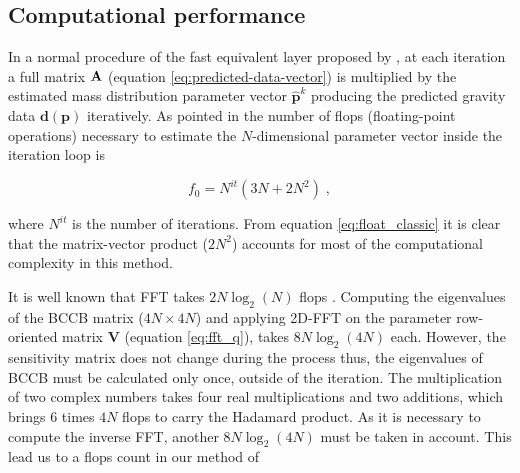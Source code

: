 \documentclass[manuscript,revised]{geophysics}
\begin{document}





\subsection{Computational performance}
In a normal procedure of the fast equivalent layer proposed by \citet{siqueira-etal2017}, at each iteration a full matrix $\tensor{A}$ (equation \ref{eq:predicted-data-vector}) is multiplied by the estimated mass distribution parameter vector $\hat{\mathbf{p}}^k$ producing the predicted gravity data $\mathbf{d(p)}$  iteratively. As pointed in \citet{siqueira-etal2017} the number of flops (floating-point operations) necessary to estimate the $N$-dimensional parameter vector inside the iteration loop is

\begin{equation}
f_0 = N^{it} (3N + 2N^2) \; ,
\label{eq:float_classic}
\end{equation}

\noindent where $N^{it}$ is the number of iterations. From equation \ref{eq:float_classic} it is clear that the matrix-vector product ($2N^2$) accounts for most of the computational complexity in this method.

It is well known that FFT takes $2 N \log_2(N)$ flops \citep{chu1999inside}. Computing the eigenvalues of the BCCB matrix ($4N \times 4N$) and applying 2D-FFT on the parameter row-oriented matrix $\mathbf{V}$ (equation \ref{eq:fft_q}), takes $8N \log_2(4N)$ each. However, the sensitivity matrix does not change during the process thus, the eigenvalues of BCCB must be calculated only once, outside of the iteration. The multiplication of two complex numbers takes four real multiplications and two additions, which brings 6 times $4N$ flops to carry the Hadamard product. As it is necessary to compute the inverse FFT, another $8N \log_2(4N)$ must be taken in account. This lead us to a flops count in our method of
\end{document}
